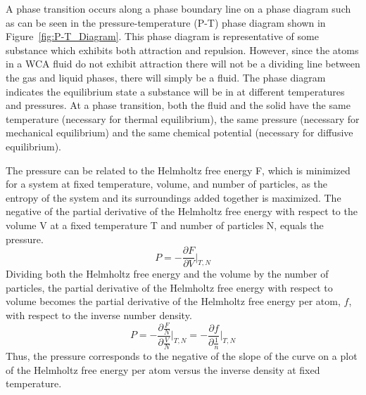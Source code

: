 \documentclass[double,12pt]{beavtex}
\begin{document}
A phase transition occurs along a phase boundary line on a phase diagram
such as can be seen in the pressure-temperature (P-T) phase diagram
shown in Figure~\ref{fig:P-T_Diagram}. 
%
%
This phase diagram is 
representative of some substance 
which exhibits both attraction and repulsion. However, since 
the atoms in a WCA fluid do not exhibit attraction there will not be a 
dividing line between the gas and liquid phases, there will simply
be a fluid.
The phase diagram indicates the equilibrium state a substance will be in at
different temperatures and pressures.
At a phase transition, both the fluid and the solid have 
the same temperature (necessary 
for thermal equilibrium), the same pressure (necessary for mechanical 
equilibrium) and the same chemical potential (necessary for diffusive equilibrium).

The pressure can be related to the Helmholtz free energy F, which is minimized 
for a system at fixed temperature, volume, and number of particles, as the 
entropy of the system and its surroundings added together is maximized. The negative of 
the partial derivative of the Helmholtz free energy with respect to the volume V 
at a fixed temperature T and number of particles N, equals the pressure. 
\begin{equation}{P=-\frac{\partial{F}}{\partial{V}}\bigg|_{T,N}}\end{equation}
\noindent Dividing both the Helmholtz free energy and the volume by the 
number of particles, the partial derivative of the Helmholtz free energy 
with respect to volume becomes the partial derivative of the Helmholtz 
free energy per atom, $f$,  with respect to the inverse number density. 
\begin{equation}{P=-\frac{\partial{\frac{F}{N}}}{\partial{\frac{V}{N}}}\bigg|_{T,N} = -\frac{\partial{f}}{\partial{\frac{1}{n}}}\bigg|_{T,N}}\end{equation} 
Thus, the pressure corresponds to the negative of the slope of the curve 
on a plot of the Helmholtz free energy per atom versus the inverse 
density at fixed temperature. 
 
\end{document}
